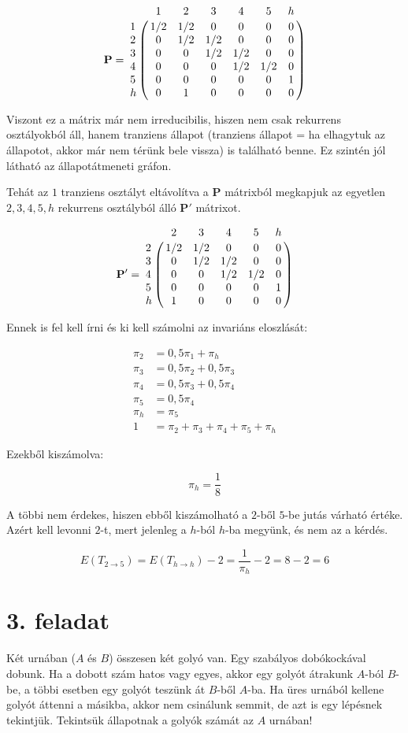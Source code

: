 \documentclass[a4paper,12pt]{article}   		%
\begin{document}
\[
\mathbf{P} = 
\bordermatrix{
~	&	1	&	2	&	3	&	4	&	5	&    h    \cr
1	&	1/2	&	1/2	&	0	&	0	&	0	&    0    \cr
2	&	0	&	1/2	&	1/2	&	0	&	0	&    0    \cr
3	&	0	&	0	&	1/2	&	1/2	&	0	&    0    \cr
4	&	0	&	0	&	0	&	1/2	&	1/2	&    0    \cr
5	&	0	&	0	&	0	&	0	&	0   &    1    \cr
h	&	0	&	1	&	0	&	0	&	0   &    0}
\]

Viszont ez a mátrix már nem irreducibilis, hiszen nem csak rekurrens
osztályokból áll, hanem tranziens állapot (tranziens állapot = ha 
elhagytuk az állapotot, akkor már nem térünk bele vissza) is található 
benne. Ez szintén jól látható az állapotátmeneti gráfon.

Tehát az ${1}$ tranziens osztályt eltávolítva a $\mathbf{P}$ mátrixból
megkapjuk az egyetlen ${2, 3, 4, 5, h}$ rekurrens osztályból álló
$\mathbf{P'}$ mátrixot.

\[
\mathbf{P'} = 
\bordermatrix{
~	&	2	&	3	&	4	&	5	&    h    \cr
2	&	1/2	&	1/2	&	0	&	0	&    0    \cr
3	&	0	&	1/2	&	1/2	&	0	&    0    \cr
4	&	0	&	0	&	1/2	&	1/2	&    0    \cr
5	&	0	&	0	&	0	&	0   &    1    \cr
h	&	1	&	0	&	0	&	0   &    0}
\]

Ennek is fel kell írni és ki kell számolni az invariáns eloszlását:

\begin{align*}
\pi_2 &= 0,5 \pi_1 + \pi_h \\
\pi_3 &= 0,5 \pi_2 + 0,5 \pi_3 \\
\pi_4 &= 0,5 \pi_3 + 0,5 \pi_4 \\
\pi_5 &= 0,5 \pi_4 \\
\pi_h &= \pi_5 \\
1 &= \pi_2 + \pi_3 + \pi_4 + \pi_5 + \pi_h
\end{align*}

Ezekből kiszámolva:

\[
\pi_h = \frac{1}{8}
\]

A többi nem érdekes, hiszen ebből kiszámolható a $2$-ből $5$-be
jutás várható értéke. Azért kell levonni $2$-t, mert jelenleg a
$h$-ból $h$-ba megyünk, és nem az a kérdés.

\[
E(T_{2 \to 5}) = E(T_{h \to h}) - 2 = \frac{1}{\pi_h} - 2 =
8-2 = 6
\]

\pagebreak
\section*{3. feladat}
Két urnában ($A$ és $B$) összesen két golyó van. Egy szabályos 
dobókockával dobunk. Ha a dobott szám hatos vagy egyes, akkor egy
golyót átrakunk $A$-ból $B$-be, a többi esetben egy golyót teszünk
át $B$-ből $A$-ba. Ha üres urnából kellene golyót áttenni a másikba,
akkor nem csinálunk semmit, de azt is egy lépésnek tekintjük.
Tekintsük állapotnak a golyók számát az $A$ urnában!
\end{document}
